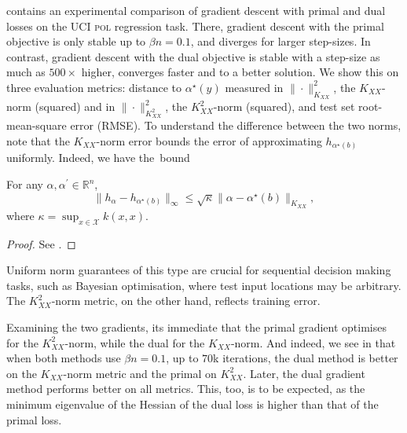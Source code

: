  contains an experimental comparison of gradient descent with primal and dual losses on the UCI \textsc{pol} regression task. 
There, gradient descent with the primal objective is only stable up to $\beta n=0.1$, and diverges for larger step-sizes. In contrast, gradient descent with the dual objective is stable with a step-size as much as $500\times$ higher, converges faster and to a better solution. We show this on three evaluation metrics: distance to $\alpha^\star(y)$ measured in $\|\cdot\|^2_{K_{XX}}$, the $K_{XX}$-norm (squared) and in $\|\cdot\|^2_{K_{XX}^2}$, the $K_{XX}^2$-norm (squared), and test set root-mean-square error (RMSE). \label{ntn:kxx_norm}\label{ntn:kxx_norm_squared}To understand the difference between the two norms, note that the $K_{XX}$-norm error bounds the error of approximating $h_{\alpha^\star(b)}$ uniformly. Indeed, we have the~bound
\begin{selfproposition}
    \label{prop:uniform_approximation}
For any $\alpha, \alpha^{\prime} \in \mathbb{R}^n$,
$$
\|h_\alpha-h_{\alpha^{\star}(b)}\|_{\infty} \leq \sqrt{\kappa}\|\alpha-\alpha^{\star}(b)\|_{K_{XX}},
$$
where $\kappa=\sup _{x \in \mathcal{X}} k(x, x)$.
\end{selfproposition}
\begin{proof}
See .
\end{proof}

Uniform norm guarantees of this type are crucial for sequential decision making tasks, such as Bayesian optimisation, where test input locations may be arbitrary. The $K_{XX}^2$-norm metric, on the other hand, reflects training error. 

Examining the two gradients, its immediate that the primal gradient optimises for the $K_{XX}^2$-norm, while the dual for the $K_{XX}$-norm. And indeed, we see in  that when both methods use $\beta n=0.1$, up to $70$k iterations, the dual method is better on the $K_{XX}$-norm metric and the primal on $K_{XX}^2$. Later, the dual gradient method performs better on all metrics. This, too, is to be expected, as the minimum eigenvalue of the Hessian of the dual loss is higher than that of the primal loss.


